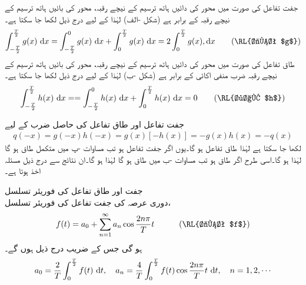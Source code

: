 جفت تفاعل  کی صورت میں محور  کی دائیں ہاتھ ترسیم کے نیچے رقبہ، محور کی بائیں ہاتھ ترسیم کے نیچے رقبہ کے  برابر ہے (شکل -الف) لہٰذا  کے لیے درج ذیل لکھا جا سکتا ہے۔
\begin{align}\label{مساوات_فوریئر_جفت_تفاعل_تکمل}
\int_{-\frac{T}{2}}^{\frac{T}{2}}g(x)\,\dif x=\int_{-\frac{T}{2}}^{0}g(x)\,\dif x+\int_{0}^{\frac{T}{2}}g(x)\,\dif x=2\int_{0}^{\frac{T}{2}}g(x),\dif x\quad \quad (\text{\RL{جفت $g$}})
\end{align}
طاق تفاعل  کی صورت میں محور  کی دائیں ہاتھ ترسیم کے نیچے رقبہ، محور کی بائیں ہاتھ ترسیم کے نیچے رقبہ ضرب منفی اکائی کے برابر ہے (شکل -ب) لہٰذا  کے لیے درج ذیل لکھا جا سکتا ہے۔
\begin{align}\label{مساوات_فوریئر_طاق_تفاعل_تکمل}
\int_{-\frac{T}{2}}^{\frac{T}{2}}h(x)\,\dif x==\int_{-\frac{T}{2}}^{0}h(x)\,\dif x+\int_{0}^{\frac{T}{2}}h(x)\,\dif x=0\quad \quad (\text{\RL{طاق $h$}})
\end{align}

جفت تفاعل  اور طاق تفاعل  کی حاصل ضرب  کے لیے
\begin{align*}
q(-x)=g(-x)h(-x)=g(x)[-h(x)]=-g(x)h(x)=-q(x)
\end{align*}
لکھا جا سکتا ہے لہٰذا   طاق تفاعل ہو گا۔یوں اگر  جفت تفاعل ہو تب مساوات -پ میں متکمل  طاق ہو گا لہٰذا  ہو گا۔اسی طرح اگر  طاق ہو تب مساوات -ب میں  طاق ہو گا لہٰذا  ہو گا۔ان نتائج سے درج ذیل مسئلہ اخذ ہوتا ہے۔

\quad جفت اور طاق تفاعل کی فوریئر تسلسل\\ 
دوری عرصہ  کی جفت تفاعل  کی فوریئر تسلسل، 
\begin{align}\label{مساوات_فوریئر_جفت_فوریئر_تسلسل}
f(t)=a_0+\sum_{n=1}^{\infty} a_n\cos \frac{2n\pi}{T}t\quad \quad \quad (\text{\RL{جفت $f$}})
\end{align}
 ہو گی جس کے  ضریب  درج ذیل ہوں گے۔
\begin{align}\label{مساوات_فوریئر_جفت_تسلسل_عددی_سر}
a_0=\frac{2}{T}\int_{0}^{\frac{T}{2}}f(t)\,\dif t, \quad a_n=\frac{4}{T}\int_{0}^{\frac{T}{2}}f(t)\cos \frac{2n\pi}{T}t\,\dif t,\quad n=1,2,\cdots
\end{align}
 
